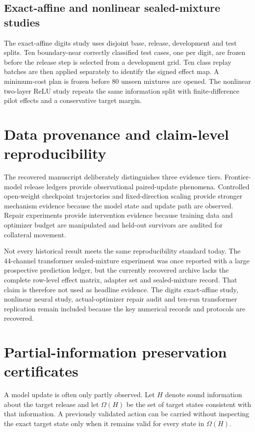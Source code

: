 \documentclass[11pt,letterpaper]{article}
\theoremstyle{plain}
\newcommand{\1}{\mathbf 1}
\begin{document}
\subsection{Exact-affine and nonlinear sealed-mixture studies}
The exact-affine digits study uses disjoint base, release, development and test splits. Ten boundary-near correctly classified test cases, one per digit, are frozen before the release step is selected from a development grid. Ten class replay batches are then applied separately to identify the signed effect map. A minimum-cost plan is frozen before 80 unseen mixtures are opened. The nonlinear two-layer ReLU study repeats the same information split with finite-difference pilot effects and a conservative target margin.

\section{Data provenance and claim-level reproducibility}
The recovered manuscript deliberately distinguishes three evidence tiers. Frontier-model release ledgers provide observational paired-update phenomena. Controlled open-weight checkpoint trajectories and fixed-direction scaling provide stronger mechanism evidence because the model state and update path are observed. Repair experiments provide intervention evidence because training data and optimizer budget are manipulated and held-out survivors are audited for collateral movement.

Not every historical result meets the same reproducibility standard today. The 44-channel transformer sealed-mixture experiment was once reported with a large prospective prediction ledger, but the currently recovered archive lacks the complete row-level effect matrix, adapter set and sealed-mixture record. That claim is therefore not used as headline evidence. The digits exact-affine study, nonlinear neural study, actual-optimizer repair audit and ten-run transformer replication remain included because the key numerical records and protocols are recovered.




\section{Partial-information preservation certificates}
A model update is often only partly observed. Let $H$ denote sound information about the target release and let $\Omega(H)$ be the set of target states consistent with that information. A previously validated action can be carried without inspecting the exact target state only when it remains valid for every state in $\Omega(H)$.
\end{document}
